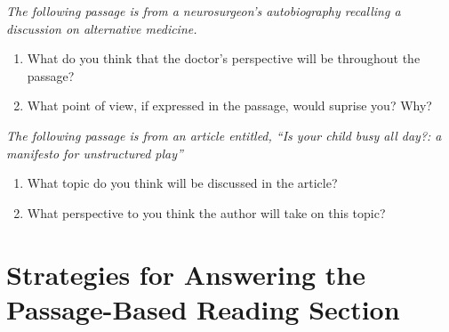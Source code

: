 \documentclass[12pt]{book}
\begin{document}
\bigskip
\textit{The following passage is from a neurosurgeon's autobiography recalling a discussion on alternative medicine.}\\
\begin{enumerate}
\item What do you think that the doctor's perspective will be throughout the passage? \hrulefill  \\
\item What point of view, if expressed in the passage, would suprise you? Why? \hrulefill \\
\end{enumerate}

\bigskip
\textit{The following passage is from an article entitled, ``Is your child busy all day?: a manifesto for unstructured play''}\\
\begin{enumerate}
\item What topic do you think will be discussed in the article? \hrulefill
\item What perspective to you think the author will take on this topic? \hrulefill
\end{enumerate}

\newpage
\section[Passage-Based Section]{Strategies for Answering the Passage-Based Reading Section}
\end{document}
